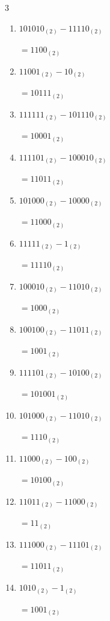 \begin{multicols}{3}
\begin{enumerate}
  \item $101010_{(2)} - 11110_{(2)}$

        $=1100_{(2)}$

  \item $11001_{(2)} - 10_{(2)}$

        $=10111_{(2)}$

  \item $111111_{(2)} - 101110_{(2)}$

        $=10001_{(2)}$

  \item $111101_{(2)} - 100010_{(2)}$

        $=11011_{(2)}$

  \item $101000_{(2)} - 10000_{(2)}$

        $=11000_{(2)}$

  \item $11111_{(2)} - 1_{(2)}$

        $=11110_{(2)}$

  \item $100010_{(2)} - 11010_{(2)}$

        $=1000_{(2)}$

  \item $100100_{(2)} - 11011_{(2)}$

        $=1001_{(2)}$

  \item $111101_{(2)} - 10100_{(2)}$

        $=101001_{(2)}$

  \item $101000_{(2)} - 11010_{(2)}$

        $=1110_{(2)}$

\columnbreak %

\resetques

  \item $11000_{(2)} - 100_{(2)}$

        $=10100_{(2)}$

  \item $11011_{(2)} - 11000_{(2)}$

        $=11_{(2)}$

  \item $111000_{(2)} - 11101_{(2)}$

        $=11011_{(2)}$

  \item $1010_{(2)} - 1_{(2)}$

        $=1001_{(2)}$


\end{enumerate}
\end{multicols}
